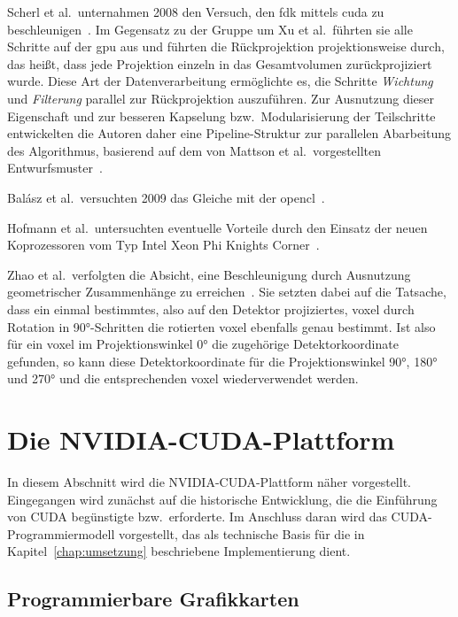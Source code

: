 Scherl et al.\ unternahmen 2008 den Versuch, den \gls{fdk} mittels \gls{cuda} zu beschleunigen~\cite{scherlkeck}. Im
Gegensatz zu der Gruppe um Xu et al.\ führten sie alle Schritte auf der \gls{gpu} aus und führten die Rückprojektion
projektionsweise durch, das heißt, dass jede Projektion einzeln in das Gesamtvolumen zurückprojiziert wurde. Diese Art
der Datenverarbeitung ermöglichte es, die Schritte \textit{Wichtung} und \textit{Filterung} parallel zur Rückprojektion
auszuführen. Zur Ausnutzung dieser Eigenschaft und zur besseren Kapselung bzw.\ Modularisierung der Teilschritte
entwickelten die Autoren daher eine Pipeline-Struktur zur parallelen Abarbeitung des Algorithmus, basierend auf dem von
Mattson et al.\ vorgestellten Entwurfsmuster~\cite{mattsan}.

Balász et al.\ versuchten 2009 das Gleiche mit der \gls{opencl}~\cite{balgab}.

Hofmann et al.\ untersuchten eventuelle Vorteile durch den Einsatz der neuen Koprozessoren vom Typ 
Intel{\textregistered} Xeon Phi{\texttrademark} {\glq}Knights Corner{\grq}~\cite{hoftrei}.

Zhao et al.\ verfolgten die Absicht, eine Beschleunigung durch Ausnutzung geometrischer Zusammenhänge zu
erreichen~\cite{zhao}. Sie setzten dabei auf die Tatsache, dass ein einmal bestimmtes, also auf den Detektor
projiziertes, \gls{voxel} durch Rotation in 90°-Schritten die rotierten \gls{voxel} ebenfalls genau bestimmt. Ist also
für ein \gls{voxel} im Projektionswinkel 0° die zugehörige Detektorkoordinate gefunden, so kann diese Detektorkoordinate
für die Projektionswinkel 90°, 180° und 270° und die entsprechenden \gls{voxel} wiederverwendet werden.

\section{Die NVIDIA{\textregistered}-CUDA{\textregistered}-Plattform}

In diesem Abschnitt wird die NVIDIA{\textregistered}-CUDA{\textregistered}-Plattform näher vorgestellt. Eingegangen wird
zunächst auf die historische Entwicklung, die die Einführung von CUDA{\textregistered} begünstigte bzw.\ erforderte. Im
Anschluss daran wird das CUDA{\textregistered}-Programmiermodell vorgestellt, das als technische Basis für die in
Kapitel~\ref{chap:umsetzung} beschriebene Implementierung dient.

\subsection{Programmierbare Grafikkarten}\label{ssec:cu_prog_gpu}

